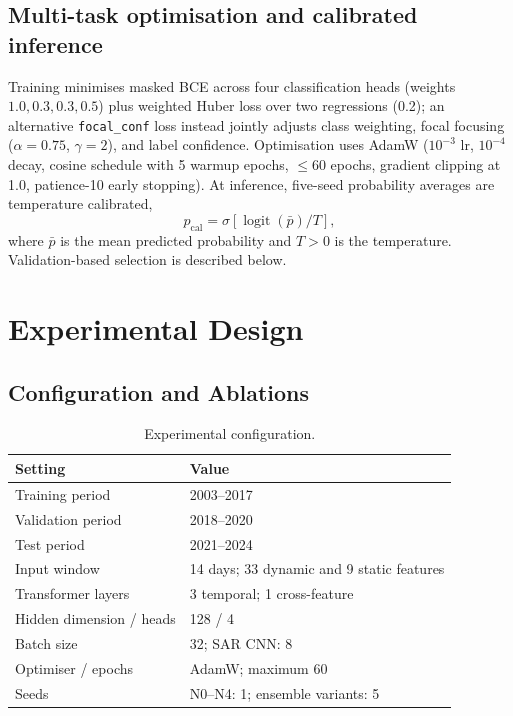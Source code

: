 \documentclass[conference]{IEEEtran}
\begin{document}
\subsection{Multi-task optimisation and calibrated inference}
Training minimises masked BCE across four classification heads (weights
$1.0,0.3,0.3,0.5$) plus weighted Huber loss over two regressions (0.2); an
alternative \texttt{focal\_conf} loss instead jointly adjusts class
weighting, focal focusing ($\alpha=0.75$, $\gamma=2$), and label confidence.
Optimisation uses AdamW ($10^{-3}$ lr, $10^{-4}$ decay, cosine schedule with
5 warmup epochs, $\leq$60 epochs, gradient clipping at 1.0, patience-10
early stopping). At inference, five-seed probability averages are temperature
calibrated,
\begin{equation}
p_{\mathrm{cal}}=\sigma\!\left[\operatorname{logit}(\bar p)/T\right],
\end{equation}
where $\bar p$ is the mean predicted probability and $T>0$ is the
temperature. Validation-based selection is described below.

\section{Experimental Design}

\subsection{Configuration and Ablations}

\begin{table}[t]
\caption{Experimental configuration.}
\label{tab:settings}
\centering
\footnotesize
\begin{tabular}{@{}p{}p{}@{}}
\toprule
Setting & Value \\
\midrule
Training period & 2003--2017 \\
Validation period & 2018--2020 \\
Test period & 2021--2024 \\
Input window & 14 days; 33 dynamic and 9 static features \\
Transformer layers & 3 temporal; 1 cross-feature \\
Hidden dimension / heads & 128 / 4 \\
Batch size & 32; SAR CNN: 8 \\
Optimiser / epochs & AdamW; maximum 60 \\
Seeds & N0--N4: 1; ensemble variants: 5 \\
\bottomrule
\end{tabular}
\end{table}
\end{document}
